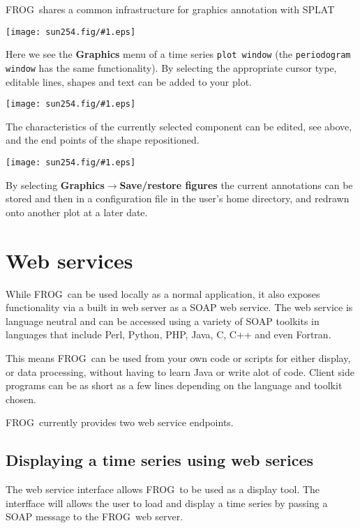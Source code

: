 \documentclass[twoside,11pt]{article}
\newcommand{\htmladdimg}[1]{}
\newcommand{\latexhtml}[2]{#1}
\newcommand{\xlabel}[1]{}
\renewcommand{\_}{\texttt{\symbol{95}}}
\newcommand{\FROG}{\textsf{FROG}}
\newcommand{\SPLAT}{\textsf{SPLAT}}
\newcommand{\mainfigure}[1]
{\begin{center}
 \latexhtml{\texttt{[image: sun254.fig/\#1.eps]}}{\htmladdimg{../sun254.fig/#1.gif}}
 \end{center}
}
\newcommand{\menuitem}[1]{\textbf{#1}}
\newcommand{\submenuitem}[2]{\latexhtml{\textbf{#1$\rightarrow$#2}}{\textbf{#1=>#2}}}
\newcommand{\hitext}[1]{\texttt{#1}}
\begin{document}
\FROG\ shares a common infrastructure for graphics annotation with \SPLAT\

\mainfigure{graphics_menu1}

Here we see the \menuitem{Graphics} menu of a time series \hitext{plot window} (the \hitext{periodogram window} has the same functionality). By selecting the appropriate cursor type, editable lines, shapes and text can be added to your plot.

\mainfigure{graphics_menu2}

The characteristics of the currently selected component can be edited, see above, and the end points of the shape repositioned.

\mainfigure{graphics_save}

By selecting \submenuitem{Graphics}{Save/restore figures} the current annotations can be stored and then in a configuration file in the user's home directory, and redrawn onto another plot at a later date.

\section{Web services\xlabel{web_services}\label{web_services}}

While \FROG\ can be used locally as a normal application, it also exposes functionality via a built in web server as a SOAP web service. The web service is language neutral and can be accessed using a variety of SOAP toolkits in languages that include Perl, Python, PHP, Java, C, C++ and even Fortran.

This means \FROG\ can be used from your own code or scripts for either display, or data processing, without having to learn Java or write alot of code. Client side programs can be as short as a few lines depending on the language and toolkit chosen.

\FROG\ currently provides two web service endpoints.

\subsection{Displaying a time series using web serices\xlabel{display_a_time_series_via_ws}}

The web service interface allows \FROG\ to be used as a display tool. The interfface will allows the user to load and display a time series by passing a SOAP message to the \FROG\ web server.
\end{document}
